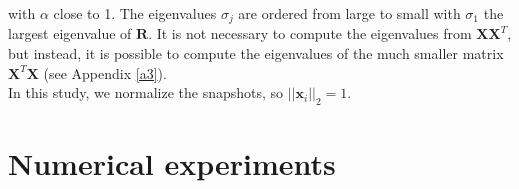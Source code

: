 \documentclass[12pt]{article}
\begin{document}
with $\alpha$ close to 1. The eigenvalues $\sigma_j$ are ordered from large to small with $\sigma_1$
the largest eigenvalue of $\mathbf{R}$. 
It is not necessary to compute the eigenvalues from $\mathbf{X}\mathbf{X}^T$, but instead, it is possible to compute the eigenvalues of the much smaller matrix $\mathbf{X}^T\mathbf{X}$ (see Appendix \ref{a3}). \\
In this study, we normalize the snapshots, so $||\mathbf{x}_i||_2=1.$

\newpage
\section{Numerical experiments}\label{numexp}
\end{document}

